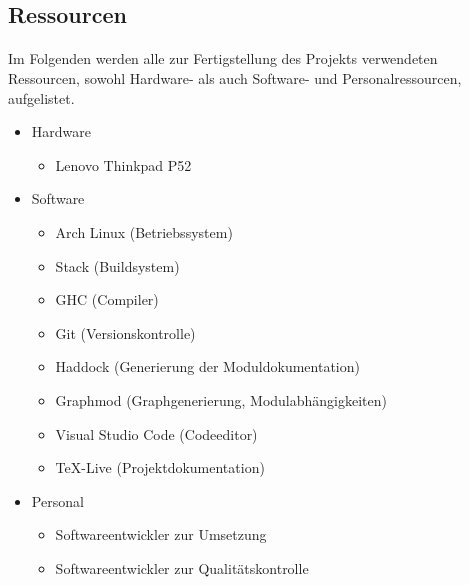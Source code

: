 \subsection{Ressourcen}
\paragraph{}
Im Folgenden werden alle zur Fertigstellung des Projekts verwendeten Ressourcen, sowohl
Hardware- als auch Software- und Personalressourcen, aufgelistet.

\begin{itemize}
    \item Hardware \begin{itemize}
              \item Lenovo Thinkpad P52
          \end{itemize}
    \item Software \begin{itemize}
              \item Arch Linux (Betriebssystem) \cite{arch}
              \item Stack (Buildsystem) \cite{stack}
              \item GHC (Compiler) \cite{ghc}
              \item Git (Versionskontrolle) \cite{git}
              \item Haddock (Generierung der Moduldokumentation) \cite{haddock}
              \item Graphmod (Graphgenerierung, Modulabhängigkeiten) \cite{graphmod}
              \item Visual Studio Code (Codeeditor) \cite{vscode}
              \item \TeX -Live (Projektdokumentation) \cite{texlive}
          \end{itemize}
    \item Personal \begin{itemize}
              \item Softwareentwickler zur Umsetzung
              \item Softwareentwickler zur Qualitätskontrolle
          \end{itemize}
\end{itemize}